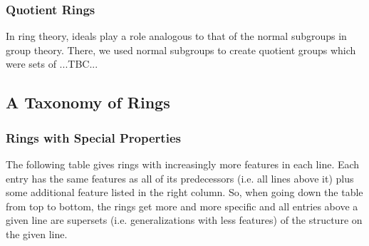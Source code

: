 

\subsubsection{Quotient Rings}
In ring theory, ideals play a role analogous to that of the normal subgroups in group theory. There, we used normal subgroups to create quotient groups which were sets of ...TBC...









\subsection{A Taxonomy of Rings}

\subsubsection{Rings with Special Properties}
The following table gives rings with increasingly more features in each line. Each entry has the same features as all of its predecessors (i.e. all lines above it) plus some additional feature listed in the right column. So, when going down the table from top to bottom, the rings get more and more specific and all entries above a given line are supersets (i.e. generalizations with less features) of the structure on the given line.


